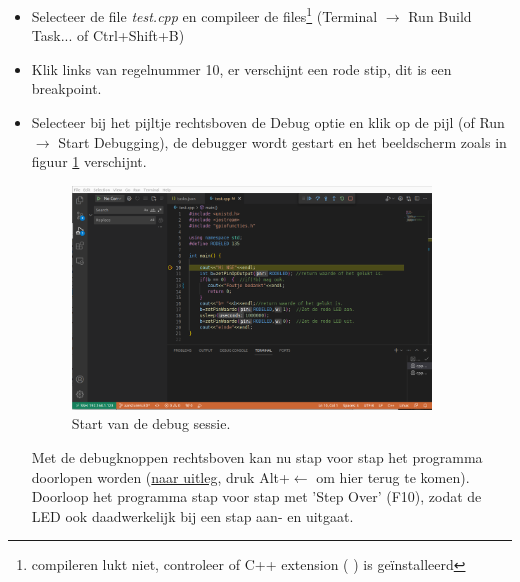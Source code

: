 \begin{enumerate}
\begin{itemize}
	\item Selecteer de file \textit{test.cpp} en compileer de files\footnote{compileren lukt niet, controleer of C++ extension ( ) is geïnstalleerd} (Terminal $\rightarrow$ Run Build Task... of Ctrl+Shift+B) 
	\item Klik links van regelnummer 10, er verschijnt een rode stip, dit is een breakpoint.
	\item Selecteer bij het pijltje rechtsboven  de Debug optie en klik op de pijl (of Run $\rightarrow$ Start Debugging), de debugger wordt gestart en het  beeldscherm zoals in figuur \ref{fig:debugScherm} verschijnt.
	\begin{figure}[h!]
		\centering
		\begin{center} 	
			\includegraphics[width=0.9\textwidth]{figuren/debugScherm}
			\caption{Start van de debug sessie.}
			\label{fig:debugScherm}   
		\end{center}
	\end{figure}
	
	Met de debugknoppen rechtsboven kan nu stap voor stap het programma doorlopen worden (\hyperlink{chp:debugknoppen}{naar uitleg}, druk Alt+\textbf{$\leftarrow$} om hier terug te komen).\\
	Doorloop het programma stap voor stap met 'Step Over' (F10), zodat de LED ook daadwerkelijk bij een stap aan- en uitgaat. 
\end{itemize}


\end{enumerate}
